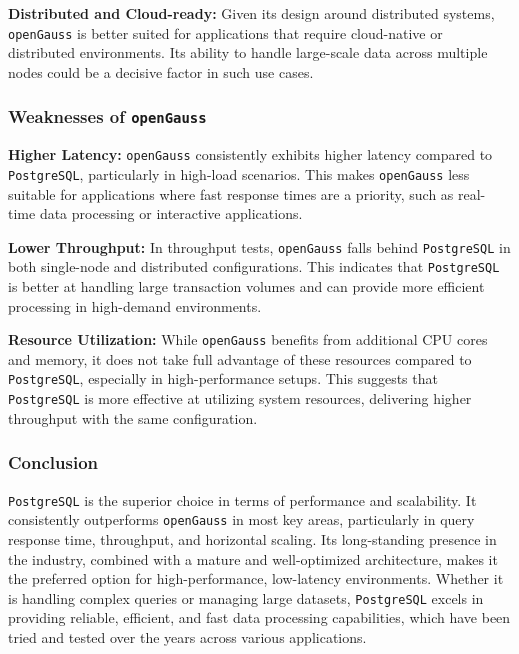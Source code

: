 \documentclass[12pt,a4paper,cs4size]{ctexart}
\begin{document}
\textbf{Distributed and Cloud-ready:} Given its design around distributed systems, \texttt{openGauss} is better suited for applications that require cloud-native or distributed environments. Its ability to handle large-scale data across multiple nodes could be a decisive factor in such use cases.

\subsubsection*{Weaknesses of \texttt{openGauss}}

\textbf{Higher Latency:} \texttt{openGauss} consistently exhibits higher latency compared to \texttt{PostgreSQL}, particularly in high-load scenarios. This makes \texttt{openGauss} less suitable for applications where fast response times are a priority, such as real-time data processing or interactive applications.

\textbf{Lower Throughput:} In throughput tests, \texttt{openGauss} falls behind \texttt{PostgreSQL} in both single-node and distributed configurations. This indicates that \texttt{PostgreSQL} is better at handling large transaction volumes and can provide more efficient processing in high-demand environments.

\textbf{Resource Utilization:} While \texttt{openGauss} benefits from additional CPU cores and memory, it does not take full advantage of these resources compared to \texttt{PostgreSQL}, especially in high-performance setups. This suggests that \texttt{PostgreSQL} is more effective at utilizing system resources, delivering higher throughput with the same configuration.

\subsubsection*{Conclusion}

\texttt{PostgreSQL} is the superior choice in terms of performance and scalability. It consistently outperforms \texttt{openGauss} in most key areas, particularly in query response time, throughput, and horizontal scaling. Its long-standing presence in the industry, combined with a mature and well-optimized architecture, makes it the preferred option for high-performance, low-latency environments. Whether it is handling complex queries or managing large datasets, \texttt{PostgreSQL} excels in providing reliable, efficient, and fast data processing capabilities, which have been tried and tested over the years across various applications.
\end{document}
